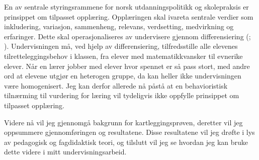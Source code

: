 \documentclass[main.tex]{subfiles}
\begin{document}
En av sentrale styringsrammene for norsk utdanningspolitikk og skolepraksis er prinsippet om tilpasset opplæring.
Opplæringen skal ivareta sentrale verdier som inkludering, variasjon, sammenheng, relevans, verdsetting, medvirkning og 
erfaringer. Dette skal operasjonaliseres av undervisere gjennom differensiering (; 
).
Undervisningen må, ved hjelp av differensiering, tilfredsstille alle elevenes tilretteleggingsbehov i klassen, fra 
elever med matematikkvansker til evnerike elever. Når en lærer jobber med elever hvor spennet er så 
pass stort, med andre ord at elevene utgjør en heterogen gruppe, da kan heller ikke undervisningen være homogenisert. 
Jeg kan derfor allerede nå påstå at en behavioristisk tilnærming til vurdering for læring vil tydeligvis ikke oppfylle 
prinsippet om tilpasset opplæring.

Videre nå vil jeg gjennomgå bakgrunn for kartleggingsprøven, deretter vil jeg oppsummere gjennomføringen og resultatene.
Disse resultatene vil jeg drøfte i lys av pedagogisk og fagdidaktisk teori, og tilslutt vil jeg se hvordan jeg 
kan bruke dette videre i mitt undervisningsarbeid. 
\end{document}
